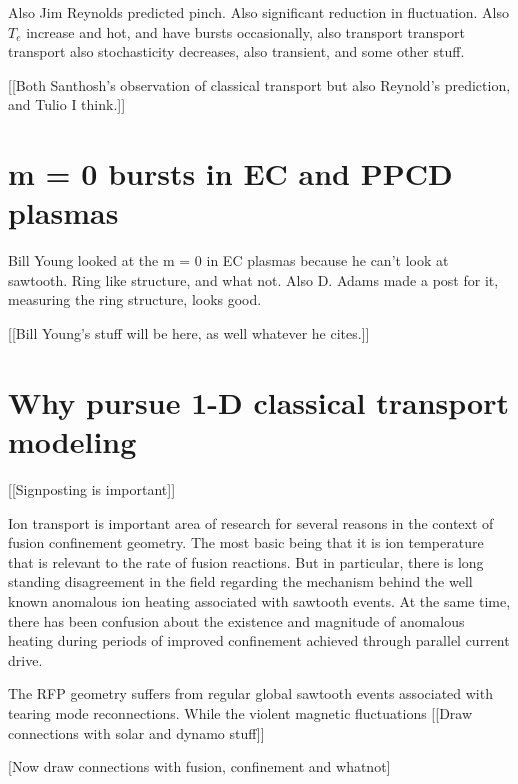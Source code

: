 \begin{refsection}

 Also Jim Reynolds predicted pinch. Also
significant reduction in fluctuation. Also $T_e$ increase and hot, and have
bursts occasionally, also transport transport transport also stochasticity
decreases, also transient, and some other stuff.


[[Both Santhosh's observation of classical transport but also Reynold's prediction, and Tulio I think.]]


\section{m = 0 bursts in EC and PPCD plasmas}\label{sec:m0_intro}

Bill Young looked at the m = 0 in EC plasmas because he can't look at sawtooth.
Ring like structure, and what not. Also D. Adams made a post for it, measuring
the ring structure, looks good.


[[Bill Young's stuff will be here, as well whatever he cites.]]


\section{Why pursue 1-D classical transport modeling}\label{sec:signpost}
[[Signposting is important]]



Ion transport is important area of research for several reasons in the context
of fusion confinement geometry. The most basic being that it is ion temperature
that is relevant to the rate of fusion reactions. But in particular, there is
long standing disagreement in the field regarding the mechanism behind the well
known anomalous ion heating associated with sawtooth events. At the same time,
there has been confusion about the existence and magnitude of anomalous heating
during periods of improved confinement achieved through parallel current drive.

The RFP geometry suffers from regular global sawtooth events associated with
tearing mode reconnections. While the violent magnetic fluctuations [[Draw
connections with solar and dynamo stuff]]

[Now draw connections with fusion, confinement and whatnot]
\printbibliography%

\end{refsection}
